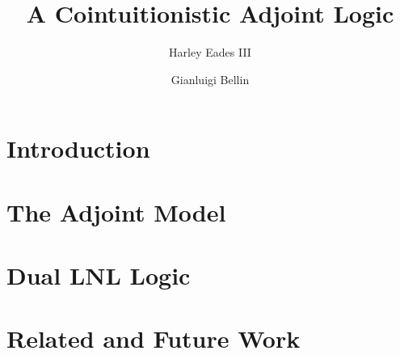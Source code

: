 \documentclass{lmcs}
\date{}
\begin{document}
\title{A Cointuitionistic Adjoint Logic}
\author{Harley Eades III}
\address{Computer Science, Augusta University, Augusta, GA}

\author{Gianluigi Bellin}
\address{Dipartimento di Informatica, Universit\`{a} di Verona, Strada Le Grazie, 37134 Verona, Italy}

\maketitle 

\begin{abstract}

  

\end{abstract}

\section{Introduction}
\label{sec:introduction}


\section{The Adjoint Model}
\label{sec:adjoint_model}


\section{Dual LNL Logic}
\label{sec:dual_lnl_logic}



\section{Related and Future Work}
\label{sec:related_work}


\end{document}
